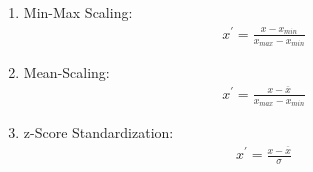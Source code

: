 \begin{enumerate}
    \item Min-Max Scaling:
    \begin{gather}
        x^{\prime} = \frac{x - x_{min}}{x_{max} - x_{min}}
        \label{sec:methods:min-max-normalizationn}
    \end{gather}
    
    \item Mean-Scaling:
    \begin{gather}
        x^{\prime} = \frac{x - \overline{x}}{x_{max} - x_{min}}
        \label{sec:methods:min-max-normalizationn}
    \end{gather}
    
    \item z-Score Standardization:
    \begin{gather}
        x^{\prime} = \frac{x - \overline{x}}{\sigma}
        \label{sec:methods:min-max-normalizationn}
    \end{gather}

\end{enumerate}
